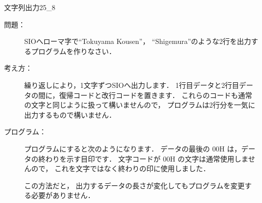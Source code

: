 \newpage
\begin{reidai}{文字列出力2}{5_8}
\begin{description}
\item[問題：] SIOへローマ字で``Tokuyama Kousen''，
``Shigemura''のような2行を出力するプログラムを作りなさい．

\item[考え方：]
繰り返しにより，1文字ずつSIOへ出力します．
1行目データと2行目データの間に，復帰コードと改行コードを置きます．
これらのコードも通常の文字と同じように扱って構いませんので，
プログラムは2行分を一気に出力するもので構いません．

\item[プログラム：]
プログラムにすると次のようになります．
データの最後の 00H は，データの終わりを示す目印です．
文字コードが 00H の文字は通常使用しませんので，
これを文字ではなく終わりの印に使用しました．

この方法だと，
出力するデータの長さが変化してもプログラムを変更する必要がありません．


\end{description}
\end{reidai}
